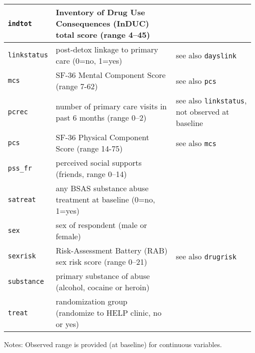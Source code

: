 \begin{longtable}{|p{2.1cm}|p{6.8cm}|p{4.5cm}|}
{\tt indtot} & Inventory of Drug Use Consequences (InDUC) total score  (range 4--45)  &
\\ \hline
{\tt linkstatus} & post-detox linkage to primary care (0=no, 1=yes)  & see also {\tt dayslink}
\\ \hline
{\tt mcs} & SF-36 Mental Component Score  (range 7-62)  & see also {\tt pcs}
\\ \hline
{\tt pcrec} & number of primary care visits in past 6 months   (range 0--2)  & see also {\tt linkstatus}, not observed at baseline \\ \hline
{\tt pcs} & SF-36 Physical Component Score  (range 14-75)  & see also {\tt mcs}
\\ \hline
{\tt pss\_fr} & perceived social supports (friends, range 0--14) & 
\\ \hline
{\tt satreat} & any BSAS substance abuse treatment at baseline (0=no, 1=yes)  &  \\ \hline
{\tt sex} & sex of respondent  (male or female)  & \\ \hline
{\tt sexrisk} & Risk-Assessment Battery (RAB) sex risk score  (range 0--21)  & see also {\tt drugrisk}
\\ \hline
{\tt substance} & primary substance of abuse (alcohol, cocaine or heroin) &
\\ \hline
{\tt treat} & randomization group (randomize to HELP clinic, no or yes) & 
\\ \hline
\end{longtable}
\noindent
Notes: Observed range is provided (at baseline) for continuous variables.

